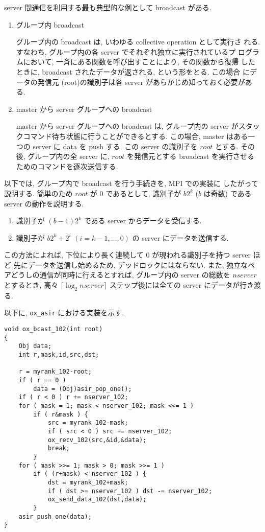 \documentclass[12pt]{jarticle}
\begin{document}
server 間通信を利用する最も典型的な例として broadcast がある.

\begin{enumerate}
\item グループ内 broadcast

グループ内の broadcast は, いわゆる collective operation として実行さ
れる. すなわち, グループ内の各 server でそれぞれ独立に実行されているプ
ログラムにおいて, 一斉にある関数を呼び出すことにより, その関数から復帰
したときに, broadcast されたデータが返される, という形をとる. この場合
にデータの発信元 (root)の識別子は各 server があらかじめ知っておく必要がある.

\item master から server グループへの broadcast

master から server グループへの broadcast は, グループ内の
server がスタックコマンド待ち状態に行うことができるとする.
この場合, master はある一つの server に data を push する.
この server の識別子を $root$ とする.
その後, グループ内の全 server に, $root$ を発信元とする
broadcast を実行させるためのコマンドを逐次送信する.
\end{enumerate}

以下では, グループ内で broadcast を行う手続きを, MPI での実装に
したがって説明する. 簡単のため $root$ が $0$ であるとして,
識別子が $b2^k$ ($b$ は奇数) である server の動作を説明する.

\begin{enumerate}
\item 識別子が $(b-1)2^k$ である server からデータを受信する.
\item 識別子が $b2^k+2^i$ $(i=k-1,\ldots,0)$ の server にデータを送信する.
\end{enumerate}

この方法によれば, 
下位により長く連続して 0 が現われる識別子を持つ server ほど
先にデータを送信し始めるため, デッドロックにはならない. また,
独立なペアどうしの通信が同時に行えるとすれば, グループ内の
server の総数を $nserver$ とするとき, 高々 $\lceil \log_2 nserver\rceil$
ステップ後には全ての server にデータが行き渡る.

以下に, {\tt ox\_asir} における実装を示す.

\begin{verbatim}
void ox_bcast_102(int root)
{
    Obj data;
    int r,mask,id,src,dst;

    r = myrank_102-root;
    if ( r == 0 )
        data = (Obj)asir_pop_one();
    if ( r < 0 ) r += nserver_102;
    for ( mask = 1; mask < nserver_102; mask <<= 1 )
        if ( r&mask ) {
            src = myrank_102-mask;
            if ( src < 0 ) src += nserver_102;
            ox_recv_102(src,&id,&data);
            break;
        }
    for ( mask >>= 1; mask > 0; mask >>= 1 )
        if ( (r+mask) < nserver_102 ) {
            dst = myrank_102+mask;
            if ( dst >= nserver_102 ) dst -= nserver_102;
            ox_send_data_102(dst,data);
        }
    asir_push_one(data);
}
\end{verbatim}
\end{document}
